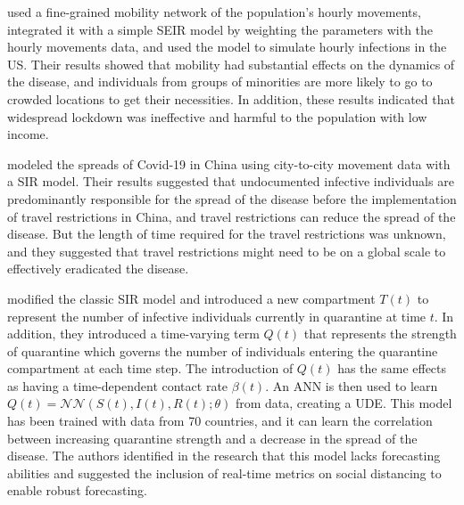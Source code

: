 \citeauthor{changMobilityNetworkModels2021} \cite{changMobilityNetworkModels2021} used a fine-grained mobility network of the population's hourly movements, integrated it with a simple \gls{SEIR} model by weighting the parameters with the hourly movements data, and used the model to simulate hourly infections in the US.
Their results showed that mobility had substantial effects on the dynamics of the disease, and individuals from groups of minorities are more likely to go to crowded locations to get their necessities.
In addition, these results indicated that widespread lockdown was ineffective and harmful to the population with low income.

\citeauthor{liSubstantialUndocumentedInfection2020} \cite{liSubstantialUndocumentedInfection2020} modeled the spreads of Covid-19 in China using city-to-city movement data with a \gls{SIR} model.
Their results suggested that undocumented infective individuals are predominantly responsible for the spread of the disease before the implementation of travel restrictions in China, and travel restrictions can reduce the spread of the disease.
But the length of time required for the travel restrictions was unknown, and they suggested that travel restrictions might need to be on a global scale to effectively eradicated the disease.

\citeauthor{dandekarMachineLearningAidedGlobal2020a} \cite{dandekarMachineLearningAidedGlobal2020a} modified the classic \gls{SIR} model and introduced a new compartment $T(t)$ to represent the number of infective individuals currently in quarantine at time $t$.
In addition, they introduced a time-varying term $Q(t)$ that represents the strength of quarantine which governs the number of individuals entering the quarantine compartment at each time step.
The introduction of $Q(t)$ has the same effects as having a time-dependent contact rate $\beta(t)$.
An \gls{ANN} is then used to learn $Q(t) = \mathcal{NN}(S(t),I(t),R(t); \theta)$ from data, creating a \gls{UDE}.
This model has been trained with data from 70 countries, and it can learn the correlation between increasing quarantine strength and a decrease in the spread of the disease.
The authors identified in the research that this model lacks forecasting abilities and suggested the inclusion of real-time metrics on social distancing to enable robust forecasting.
